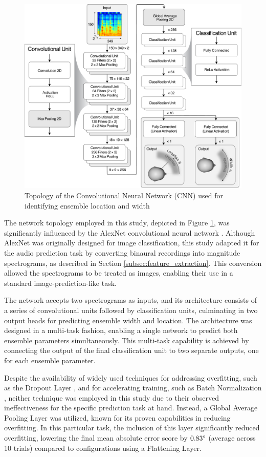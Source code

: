 \documentclass{article}
\begin{document}
\begin{figure}[ht]
  \centering
  \includegraphics[width=\linewidth]{../pictures/architecture.pdf}
  \caption{\label{fig:architecture}Topology of the Convolutional Neural Network (CNN) used for identifying ensemble location and width}
\end{figure}

The network topology employed in this study, depicted in Figure \ref{fig:architecture}, was significantly influenced by the AlexNet convolutional neural network \cite{krizhevsky_imagenet_2012}. Although AlexNet was originally designed for image classification, this study adapted it for the audio prediction task by converting binaural recordings into magnitude spectrograms, as described in Section \ref{subsec:feature_extraction}. This conversion allowed the spectrograms to be treated as images, enabling their use in a standard image-prediction-like task.

The network accepts two spectrograms as inputs, and its architecture consists of a series of convolutional units followed by classification units, culminating in two output heads for predicting ensemble width and location. The architecture was designed in a multi-task fashion, enabling a single network to predict both ensemble parameters simultaneously. This multi-task capability is achieved by connecting the output of the final classification unit to two separate outputs, one for each ensemble parameter.

Despite the availability of widely used techniques for addressing overfitting, such as the Dropout Layer \cite{srivastava_dropout_nodate}, and for accelerating training, such as Batch Normalization \cite{ioffe_batch_2015}, neither technique was employed in this study due to their observed ineffectiveness for the specific prediction task at hand. Instead, a Global Average Pooling Layer \cite{lin_network_2014} was utilized, known for its proven capabilities in reducing overfitting. In this particular task, the inclusion of this layer significantly reduced overfitting, lowering the final mean absolute error score by $0.83\degree$ (average across 10 trials) compared to configurations using a Flattening Layer.
\end{document}
